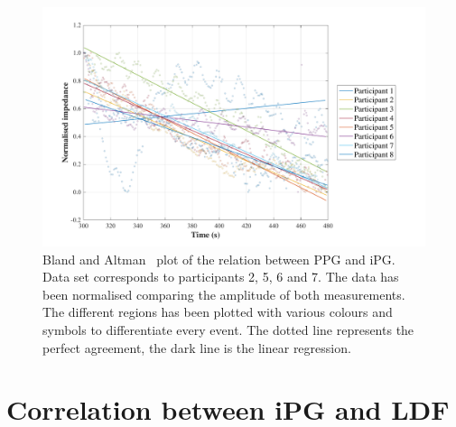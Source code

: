 \begin{figure}[!htpb]
	\includegraphics[width=1\textwidth,keepaspectratio]{figure3}    
	\caption[Bland and Altman plot of the relation between PPG and iPG]{Bland and Altman~\cite{bland1986statistical} plot of the relation between PPG and iPG. Data set corresponds to participants 2, 5, 6 and 7. The data has been normalised comparing the amplitude of both measurements. The different regions has been plotted with various colours and symbols to differentiate every event. The dotted line represents the perfect agreement, the dark line is the linear regression.}
	\label{fig:corr RED}
\end{figure}

\section{Correlation between iPG and LDF}  %
\label{section correlation 4}

